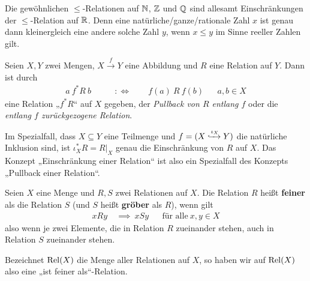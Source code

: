 \begin{bsp}
    Die gewöhnlichen $\le$-Relationen auf $\mathbb N$, $\mathbb Z$ und $\mathbb Q$ sind allesamt Einschränkungen der $\le$-Relation auf $\mathbb R$. Denn eine natürliche/ganze/rationale Zahl $x$ ist genau dann kleinergleich eine andere solche Zahl $y$, wenn $x\le y$ im Sinne reeller Zahlen gilt.
\end{bsp}


\begin{bem} \label{pullbackrel}
    Seien $X,Y$ zwei Mengen, $X\xrightarrow{f} Y$ eine Abbildung und $R$ eine Relation auf $Y$. Dann ist durch
    \begin{align*}
        a\ f^*R\ b \qquad& :\Leftrightarrow\qquad f(a)\ R\ f(b) &&a,b\in X
    \end{align*}
    eine Relation „$f^*R$“ auf $X$ gegeben, der \emph{Pullback von $R$ entlang $f$} oder die \emph{entlang $f$ zurückgezogene Relation}.

    Im Spezialfall, dass $X\subseteq Y$ eine Teilmenge und $f=(X\xhookrightarrow{\iota_X} Y)$ die natürliche Inklusion sind, ist $\iota_X^*R=R\vert_X$ genau die Einschränkung von $R$ auf $X$. Das Konzept „Einschränkung einer Relation“ ist also ein Spezialfall des Konzepts „Pullback einer Relation“.
\end{bem}


\begin{defin} \label{def:groebererelation}  
    Seien $X$ eine Menge und $R,S$ zwei Relationen auf $X$. Die Relation $R$ heißt \textbf{feiner} als die Relation $S$ (und $S$ heißt \textbf{gröber} als $R$), wenn gilt
    \begin{align*}
        xRy \ &\implies\ xSy && \text{für alle}\ x,y\in X
    \end{align*}
    also wenn je zwei Elemente, die in Relation $R$ zueinander stehen, auch in Relation $S$ zueinander stehen.

    Bezeichnet $\operatorname{Rel}(X)$ die Menge aller Relationen auf $X$, so haben wir auf $\operatorname{Rel}(X)$ also eine „ist feiner als“-Relation.
\end{defin}


